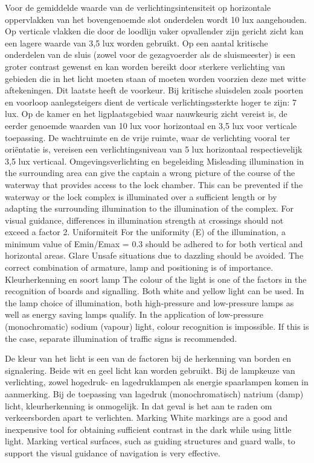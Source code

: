 Voor de gemiddelde waarde van de verlichtingsintensiteit op horizontale oppervlakken van het bovengenoemde slot
onderdelen wordt 10 lux aangehouden. Op verticale vlakken die door de loodlijn vaker opvallender zijn
gericht zicht kan een lagere waarde van 3,5 lux worden gebruikt.
Op een aantal kritische onderdelen van de sluis (zowel voor de gezagvoerder als de sluismeester) is een groter contrast
gewenst en kan worden bereikt door sterkere verlichting van gebieden die in het licht moeten staan of moeten worden voorzien
deze met witte aftekeningen. Dit laatste heeft de voorkeur. Bij kritische sluisdelen zoals poorten en voorloop
aanlegsteigers dient de verticale verlichtingssterkte hoger te zijn: 7 lux. Op de kamer en het ligplaatsgebied
waar nauwkeurig zicht vereist is, de eerder genoemde waarden van 10 lux voor horizontaal en 3,5 lux
voor verticale toepassing. De wachtruimte en de vrije ruimte, waar de verlichting vooral ter oriëntatie is,
vereisen een verlichtingsniveau van 5 lux horizontaal respectievelijk 3,5 lux verticaal.
Omgevingsverlichting en begeleiding
Misleading illumination in the surrounding area can give the captain a wrong picture of the course of
the waterway that provides access to the lock chamber. This can be prevented if the waterway or the
lock complex is illuminated over a sufficient length or by adapting the surrounding illumination to the
illumination of the complex. For visual guidance, differences in illumination strength at crossings
should not exceed a factor 2.
Uniformiteit
For the uniformity (E) of the illumination, a minimum value of Emin/Emax = 0.3 should be adhered
to for both vertical and horizontal areas.
Glare
Unsafe situations due to dazzling should be avoided. The correct combination of armature, lamp and
positioning is of importance.
Kleurherkenning en soort lamp
The colour of the light is one of the factors in the recognition of boards and signalling. Both white
and yellow light can be used.
In the lamp choice of illumination, both high-pressure and low-pressure lamps as well as energy
saving lamps qualify. In the application of low-pressure (monochromatic) sodium (vapour) light,
colour recognition is impossible. If this is the case, separate illumination of traffic signs is recommended.

De kleur van het licht is een van de factoren bij de herkenning van borden en signalering. Beide wit
en geel licht kan worden gebruikt.
Bij de lampkeuze van verlichting, zowel hogedruk- en lagedruklampen als energie
spaarlampen komen in aanmerking. Bij de toepassing van lagedruk (monochromatisch) natrium (damp) licht,
kleurherkenning is onmogelijk. In dat geval is het aan te raden om verkeersborden apart te verlichten.
Marking
White markings are a good and inexpensive tool for obtaining sufficient contrast in the dark while using
little light. Marking vertical surfaces, such as guiding structures and guard walls, to support the visual
guidance of navigation is very effective.

